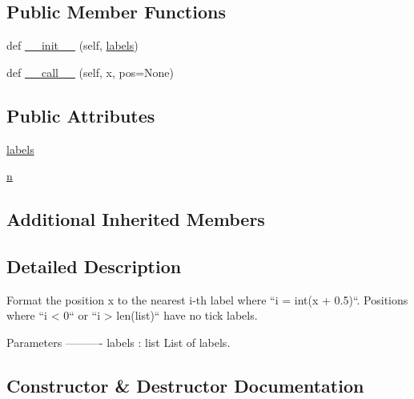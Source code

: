 \subsection*{Public Member Functions}
\begin{DoxyCompactItemize}
\item 
def \hyperlink{classmatplotlib_1_1ticker_1_1IndexFormatter_a65546f0973b409d9dcb262486794dc78}{\+\_\+\+\_\+init\+\_\+\+\_\+} (self, \hyperlink{classmatplotlib_1_1ticker_1_1IndexFormatter_a8057f9b7a5bd74b844d73f31cdb20a7f}{labels})
\item 
def \hyperlink{classmatplotlib_1_1ticker_1_1IndexFormatter_af267ca534ab3bb7bd4d1578e193d60b9}{\+\_\+\+\_\+call\+\_\+\+\_\+} (self, x, pos=None)
\end{DoxyCompactItemize}
\subsection*{Public Attributes}
\begin{DoxyCompactItemize}
\item 
\hyperlink{classmatplotlib_1_1ticker_1_1IndexFormatter_a8057f9b7a5bd74b844d73f31cdb20a7f}{labels}
\item 
\hyperlink{classmatplotlib_1_1ticker_1_1IndexFormatter_a04f368544c7d76a10aa026a3311681e8}{n}
\end{DoxyCompactItemize}
\subsection*{Additional Inherited Members}


\subsection{Detailed Description}
\begin{DoxyVerb}Format the position x to the nearest i-th label where ``i = int(x + 0.5)``.
Positions where ``i < 0`` or ``i > len(list)`` have no tick labels.

Parameters
----------
labels : list
    List of labels.
\end{DoxyVerb}
 

\subsection{Constructor \& Destructor Documentation}
\mbox{\label{classmatplotlib_1_1ticker_1_1IndexFormatter_a65546f0973b409d9dcb262486794dc78}} 
